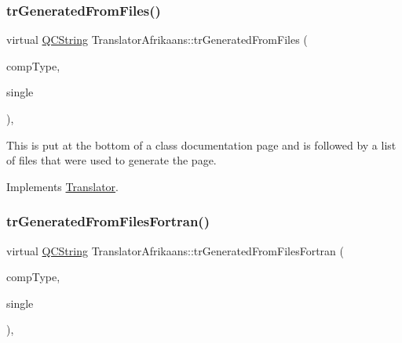 \mbox{\label{class_translator_afrikaans_a04c234f52aef193caef01b00813248bd}} 
\subsubsection{\texorpdfstring{trGeneratedFromFiles()}{trGeneratedFromFiles()}}
{\footnotesize\ttfamily virtual \mbox{\hyperlink{class_q_c_string}{Q\+C\+String}} Translator\+Afrikaans\+::tr\+Generated\+From\+Files (\begin{DoxyParamCaption}\item[{\mbox{\hyperlink{class_class_def_ae70cf86d35fe954a94c566fbcfc87939}{Class\+Def\+::\+Compound\+Type}}}]{comp\+Type,  }\item[{bool}]{single }\end{DoxyParamCaption})\hspace{0.3cm}{\ttfamily [inline]}, {\ttfamily [virtual]}}

This is put at the bottom of a class documentation page and is followed by a list of files that were used to generate the page. 

Implements \mbox{\hyperlink{class_translator}{Translator}}.

\mbox{\label{class_translator_afrikaans_a7f98c3d9f5a3dc7bfdfdcc033424b4a8}} 
\subsubsection{\texorpdfstring{trGeneratedFromFilesFortran()}{trGeneratedFromFilesFortran()}}
{\footnotesize\ttfamily virtual \mbox{\hyperlink{class_q_c_string}{Q\+C\+String}} Translator\+Afrikaans\+::tr\+Generated\+From\+Files\+Fortran (\begin{DoxyParamCaption}\item[{\mbox{\hyperlink{class_class_def_ae70cf86d35fe954a94c566fbcfc87939}{Class\+Def\+::\+Compound\+Type}}}]{comp\+Type,  }\item[{bool}]{single }\end{DoxyParamCaption})\hspace{0.3cm}{\ttfamily [inline]}, {\ttfamily [virtual]}}

